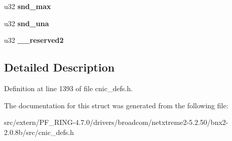 \begin{DoxyCompactItemize}
\item 
\hypertarget{structtstorm__tcp__tcp__ag__context__section_a539f213d405280a03732e25bcc41a85d}{
u32 {\bfseries snd\_\-max}}
\label{structtstorm__tcp__tcp__ag__context__section_a539f213d405280a03732e25bcc41a85d}

\item 
\hypertarget{structtstorm__tcp__tcp__ag__context__section_a9b37565fefcc01381d4e6dbefe058e4d}{
u32 {\bfseries snd\_\-una}}
\label{structtstorm__tcp__tcp__ag__context__section_a9b37565fefcc01381d4e6dbefe058e4d}

\item 
\hypertarget{structtstorm__tcp__tcp__ag__context__section_a039b96bc934088826161ff69a4aba843}{
u32 {\bfseries \_\-\_\-reserved2}}
\label{structtstorm__tcp__tcp__ag__context__section_a039b96bc934088826161ff69a4aba843}

\end{DoxyCompactItemize}


\subsection{Detailed Description}


Definition at line 1393 of file cnic\_\-defs.h.



The documentation for this struct was generated from the following file:\begin{DoxyCompactItemize}
\item 
src/extern/PF\_\-RING-\/4.7.0/drivers/broadcom/netxtreme2-\/5.2.50/bnx2-\/2.0.8b/src/cnic\_\-defs.h\end{DoxyCompactItemize}
